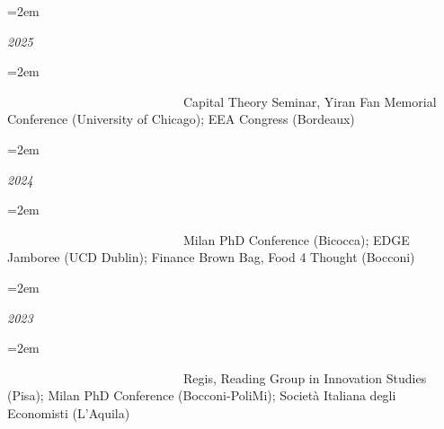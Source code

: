 \documentclass{scrartcl}
\newcommand{\MarginText}[1]{\marginpar{\raggedleft\itshape\small#1}} %
\newlength{\datebox}\settowidth{\datebox}{Spring 2011} %
\newcommand{\NewEntry}[3]{\noindent\hangindent=2em\hangafter=0 \parbox{\datebox}{\small \textit{#1}}\hspace{1.5em} #2 #3 %
\vspace{0.5em}} %
\newcommand{\Description}[1]{\hangindent=2em\hangafter=0\noindent\raggedright\footnotesize{#1}\par\normalsize\vspace{1em}} %
\begin{document}
\begin{cv}{}





\vspace{1em}

\NewEntry{2025}{}

\vspace{-1.5em}
\Description{\MarginText{}
\ \ \ \ \ \ \ \ \ \ \ \ \ \ \ \ \ \ \ \  \ \ \ \ \ \ \ \  {Capital Theory Seminar, Yiran Fan Memorial Conference (University of Chicago); EEA Congress (Bordeaux)}}%



\NewEntry{2024}{}

\vspace{-1.5em}
\Description{\MarginText{}
\ \ \ \ \ \ \ \ \ \ \ \ \ \ \ \ \ \ \ \  \ \ \ \ \ \ \ \  {Milan PhD Conference (Bicocca); EDGE Jamboree (UCD Dublin); Finance Brown Bag, Food 4 Thought (Bocconi)}}%


\NewEntry{2023}{}

\vspace{-1.5em}
\Description{\MarginText{}  
\ \ \ \ \ \ \ \ \ \ \ \ \ \ \ \ \ \ \ \  \ \ \ \ \ \ \ \  {Regis, Reading Group in Innovation Studies (Pisa); Milan PhD Conference (Bocconi-PoliMi); Società Italiana degli Economisti (L'Aquila)}}%





\end{cv}
\end{document}
